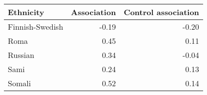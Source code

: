 \begin{tabular}{lrr}
\toprule
      Ethnicity &  Association &  Control association \\
\midrule
Finnish-Swedish &        -0.19 &                -0.20 \\
           Roma &         0.45 &                 0.11 \\
        Russian &         0.34 &                -0.04 \\
           Sami &         0.24 &                 0.13 \\
         Somali &         0.52 &                 0.14 \\
\bottomrule
\end{tabular}
